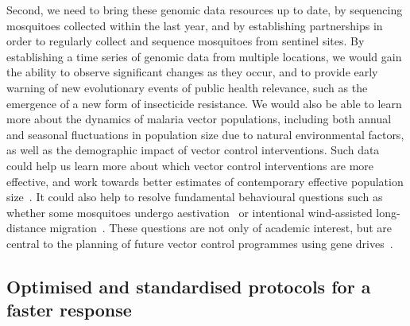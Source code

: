 \begin{refsection}
Second, we need to bring these genomic data resources up to date, by sequencing mosquitoes collected within the last year, and by establishing partnerships in order to regularly collect and sequence mosquitoes from sentinel sites.
%
By establishing a time series of genomic data from multiple locations, we would gain the ability to observe significant changes as they occur, and to provide early warning of new evolutionary events of public health relevance, such as the emergence of a new form of insecticide resistance.
%
We would also be able to learn more about the dynamics of malaria vector populations, including both annual and seasonal fluctuations in population size due to natural environmental factors, as well as the demographic impact of vector control interventions.
%
Such data could help us learn more about which vector control interventions are more effective, and work towards better estimates of contemporary effective population size~\parencite{Hui2015}.
%
It could also help to resolve fundamental behavioural questions such as whether some mosquitoes undergo aestivation~\parencite{Dao2014} or intentional wind-assisted long-distance migration~\parencite{Huestis2019}.
%
These questions are not only of academic interest, but are central to the planning of future vector control programmes using gene drives~\parencite{North2019}.


\subsection{Optimised and standardised protocols for a faster response}



\end{refsection}
